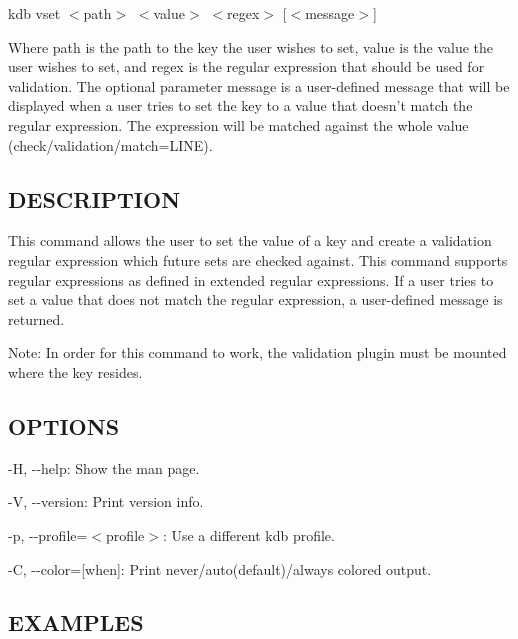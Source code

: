 {\ttfamily kdb vset $<$path$>$ $<$value$>$ $<$regex$>$ \mbox{[}$<$message$>$\mbox{]}}

Where {\ttfamily path} is the path to the key the user wishes to set, {\ttfamily value} is the value the user wishes to set, and {\ttfamily regex} is the regular expression that should be used for validation. The optional parameter {\ttfamily message} is a user-\/defined message that will be displayed when a user tries to set the key to a value that doesn't match the regular expression. The expression will be matched against the whole value ({\ttfamily check/validation/match=L\+I\+N\+E}).

\subsection*{D\+E\+S\+C\+R\+I\+P\+T\+I\+O\+N}

This command allows the user to set the value of a key and create a validation regular expression which future sets are checked against. This command supports regular expressions as defined in extended regular expressions. If a user tries to set a value that does not match the regular expression, a user-\/defined message is returned.

Note\+: In order for this command to work, the {\ttfamily validation} plugin must be mounted where the key resides.

\subsection*{O\+P\+T\+I\+O\+N\+S}


\begin{DoxyItemize}
\item {\ttfamily -\/\+H}, {\ttfamily -\/-\/help}\+: Show the man page.
\item {\ttfamily -\/\+V}, {\ttfamily -\/-\/version}\+: Print version info.
\item {\ttfamily -\/p}, {\ttfamily -\/-\/profile}=$<$profile$>$\+: Use a different kdb profile.
\item {\ttfamily -\/\+C}, {\ttfamily -\/-\/color}=\mbox{[}when\mbox{]}\+: Print never/auto(default)/always colored output.
\end{DoxyItemize}

\subsection*{E\+X\+A\+M\+P\+L\+E\+S}

